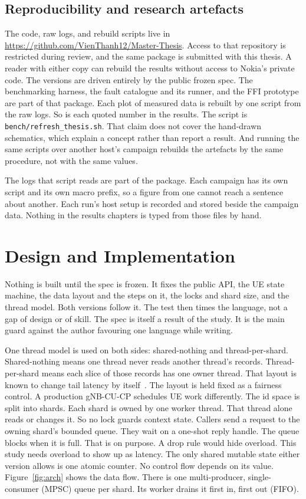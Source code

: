\documentclass[english,oneside,a4paper,censored,csm,software-track-2020]{HYthesisML}
\begin{document}
\section{Reproducibility and research artefacts}\label{sec:repro}
The code, raw logs, and rebuild scripts live in
\url{https://github.com/VienThanh12/Master-Thesis}. Access to that repository is
restricted during review, and the same package is submitted with this thesis.
A reader with either copy can rebuild the results without access to Nokia's
private code. The versions are driven entirely by the public frozen spec. The
benchmarking harness, the fault catalogue and its runner, and the FFI
prototype are part of that package. Each plot of measured data is rebuilt by
one script from the raw logs. So is each quoted number in the results. The
script is \texttt{bench/refresh\_thesis.sh}. That claim does not cover the
hand-drawn schematics, which explain a concept rather than report a result.
And running the same scripts over another host's campaign rebuilds the
artefacts by the same procedure, not with the same values.

The logs that script reads are part of the package. Each campaign has its own
script and its own macro prefix, so a figure from one cannot reach a sentence
about another. Each run's host setup is recorded and stored beside the
campaign data. Nothing in the results chapters is typed from those files by
hand.

\chapter{Design and Implementation\label{chapter:design}}

Nothing is built until the spec is frozen. It fixes the public API, the UE
state machine, the data layout and the steps on it, the locks and shard size,
and the thread model. Both versions follow it. The test then times the
language, not a gap of design or of skill. The spec is itself a result of
the study. It is the main guard against the author favouring one language while writing.

One thread model is used on both sides: shared-nothing and thread-per-shard.
Shared-nothing means one thread never reads another thread’s records. Thread-per-shard means
each slice of those records has one owner thread.
That layout is known to change tail latency by
itself~\cite{enberg2019threadpercore}. The layout is held fixed as a fairness
control. A production gNB-CU-CP schedules UE work differently. The id space is split into shards. Each
shard is owned by one worker thread. That thread alone reads or changes it.
So no lock guards context state. Callers send a request to the owning shard's
bounded queue. They wait on a one-shot reply handle. The queue blocks when it
is full. That is on purpose. A drop rule would hide overload. This study needs
overload to show up as latency. The only shared mutable state either version
allows is one atomic counter. No control flow depends on its value.
Figure~\ref{fig:arch} shows the data flow. There is one multi-producer,
single-consumer (MPSC) queue per shard. Its worker drains it first in, first
out (FIFO).
\end{document}
